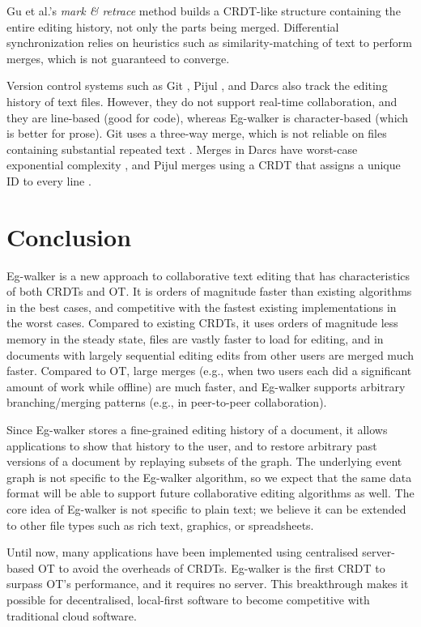 \documentclass[sigplan,10pt]{acmart}
\newcommand{\algname}{Eg-walker\xspace}
\begin{document}
Gu et al.'s \emph{mark \& retrace} method \cite{Gu2005} builds a CRDT-like structure containing the entire editing history, not only the parts being merged.
Differential synchronization \cite{Fraser2009} relies on heuristics such as similarity-matching of text to perform merges, which is not guaranteed to converge.

Version control systems such as Git \cite{Coglan2019}, Pijul \cite{pijul}, and Darcs \cite{darcs} also track the editing history of text files.
However, they do not support real-time collaboration, and they are line-based (good for code), whereas \algname is character-based (which is better for prose).
Git uses a three-way merge, which is not reliable on files containing substantial repeated text \cite{Khanna2007}.
Merges in Darcs have worst-case exponential complexity \cite{darcs-book}, and Pijul merges using a CRDT that assigns a unique ID to every line \cite{pijul-theory}.

\section{Conclusion}

\algname is a new approach to collaborative text editing that has characteristics of both CRDTs and OT.
It is orders of magnitude faster than existing algorithms in the best cases, and competitive with the fastest existing implementations in the worst cases.
Compared to existing CRDTs, it uses orders of magnitude less memory in the steady state, files are vastly faster to load for editing, and in documents with largely sequential editing edits from other users are merged much faster.
Compared to OT, large merges (e.g., when two users each did a significant amount of work while offline) are much faster, and \algname supports arbitrary branching/merging patterns (e.g., in peer-to-peer collaboration).

Since \algname stores a fine-grained editing history of a document, it allows applications to show that history to the user, and to restore arbitrary past versions of a document by replaying subsets of the graph.
The underlying event graph is not specific to the \algname algorithm, so we expect that the same data format will be able to support future collaborative editing algorithms as well.
The core idea of \algname is not specific to plain text; we believe it can be extended to other file types such as rich text, graphics, or spreadsheets.

Until now, many applications have been implemented using centralised server-based OT to avoid the overheads of CRDTs.
\algname is the first CRDT to surpass OT's performance, and it requires no server.
This breakthrough makes it possible for decentralised, local-first software \cite{Kleppmann2019localfirst} to become competitive with traditional cloud software.
\end{document}

